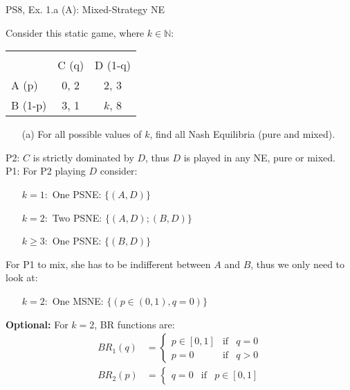 \begin{frame}{PS8, Ex. 1.a (A): Mixed-Strategy NE}
    \begin{multicols}{2}
      Consider this static game, where $k\in\mathbb{N}:$
      \vspace{-16pt}
      \begin{table}
        \begin{tabular}{l|c|c|}
          \multicolumn{1}{c}{} & \multicolumn{2}{c}{} \\
          \multicolumn{1}{c}{} & \multicolumn{1}{c}{C (q)} & \multicolumn{1}{c}{\color{blue}D (1-q)} \\\cline{2-3}
          A (p)   & 0, 2 & 2, \color{blue}3 \\\cline{2-3}
          B (1-p) & 3, 1 & $k$, \color{blue}8 \\\cline{2-3}
        \end{tabular}
      \end{table}
      \begin{itemize}
        \item[(a)] For all possible values of $k$, find all Nash Equilibria (pure and mixed).
      \end{itemize}
      P2: $C$ is strictly dominated by $D$, thus $D$ is played in any NE, pure or mixed.\\\medskip
      P1: For P2 playing $D$ consider:
      \begin{itemize}
        \item[$k=1:$] One PSNE: $\{(A,D)\}$
        \item[$k=2:$] Two PSNE: $\{(A,D);(B,D)\}$
        \item[$k\geq3:$] One PSNE: $\{(B,D)\}$
      \end{itemize}
      For P1 to mix, she has to be indifferent between $A$ and $B$, thus we only need to look at:
      \begin{itemize}
        \item[$k=2:$] One MSNE: $\{(p\in(0,1),q=0)\}$
      \end{itemize}
      \vfill\null\columnbreak
      \textbf{Optional:} For $k=2$, BR functions are:
      \vspace{-8pt}
      \begin{align*}
        BR_1(q)&=\left\{ \begin{array}{lcl}
            p\in[0,1] & \text{if} & q=0 \\
            p=0       & \text{if} & q>0
        \end{array}\right. \\
        BR_2(p)&=\left\{ \begin{array}{lcl}
            q=0       & \text{if} & p\in[0,1]
        \end{array}\right.
      \end{align*}
      \vfill\null
    \end{multicols}
\end{frame}


